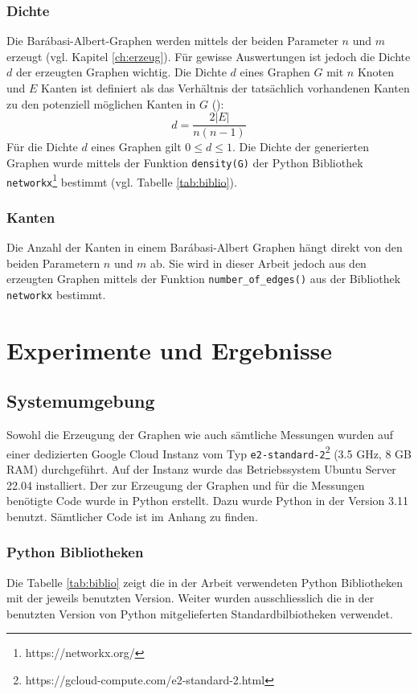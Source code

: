 \documentclass{ffhsthesis}
\begin{document}
\subsection{Dichte}
Die Barábasi-Albert-Graphen werden mittels der beiden Parameter $n$ und $m$ erzeugt (vgl. Kapitel \ref{ch:erzeug}). Für gewisse Auswertungen ist jedoch die Dichte $d$ der erzeugten Graphen wichtig. Die Dichte $d$ eines Graphen $G$ mit $n$ Knoten und $E$ Kanten ist definiert als das Verhältnis der tatsächlich vorhandenen Kanten zu den potenziell möglichen Kanten in $G$ (\cite{brandes2010graphentheorie}):
\begin{equation}
    d = \frac{2 |E|}{n(n-1)}
\end{equation}
Für die Dichte $d$ eines Graphen gilt $0 \leq d \leq 1$. Die Dichte der generierten Graphen wurde mittels der Funktion \texttt{density(G)} der Python Bibliothek \texttt{networkx}\footnote{https://networkx.org/} bestimmt (vgl. Tabelle \ref{tab:biblio}).

\subsection{Kanten}
Die Anzahl der Kanten in einem Barábasi-Albert Graphen hängt direkt von den beiden Parametern $n$ und $m$ ab. Sie wird in dieser Arbeit jedoch aus den erzeugten Graphen mittels der Funktion \texttt{number\_of\_edges()} aus der Bibliothek \texttt{networkx} bestimmt.
\chapter{Experimente und Ergebnisse} %

\section{Systemumgebung}
Sowohl die Erzeugung der Graphen wie auch sämtliche Messungen wurden auf einer dedizierten Google Cloud Instanz vom Typ \texttt{e2-standard-2}\footnote{https://gcloud-compute.com/e2-standard-2.html} (3.5 GHz, 8 GB RAM) durchgeführt. Auf der Instanz wurde das Betriebssystem Ubuntu Server 22.04 installiert. Der zur Erzeugung der Graphen und für die Messungen benötigte Code wurde in Python erstellt. Dazu wurde Python in der Version 3.11 benutzt. Sämtlicher Code ist im Anhang zu finden.
\subsection{Python Bibliotheken}
Die Tabelle \ref{tab:biblio} zeigt die in der Arbeit verwendeten Python Bibliotheken mit der jeweils benutzten Version. Weiter wurden ausschliesslich die in der benutzten Version von Python mitgelieferten Standardbilbiotheken verwendet.
\end{document}
